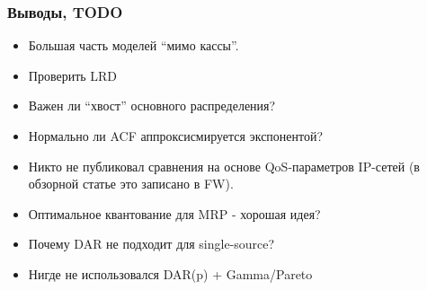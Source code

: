 \documentclass[10pt,pdf,hyperref={unicode}]{beamer}
\begin{document}
\begin{frame}
    \frametitle{Выводы, TODO}
    \begin{itemize}
        \item Большая часть моделей ``мимо кассы''.
        \item Проверить LRD
        \item Важен ли ``хвост'' основного распределения?
        \item Нормально ли ACF аппроксисмируется экспонентой?
        \item Никто не публиковал сравнения на основе QoS-параметров
            IP-сетей (в обзорной статье это записано в FW).
        \item Оптимальное квантование для MRP - хорошая идея?
        \item Почему DAR не подходит для single-source?
        \item Нигде не использовался DAR(p) + Gamma/Pareto
    \end{itemize}
\end{frame}
\end{document}

